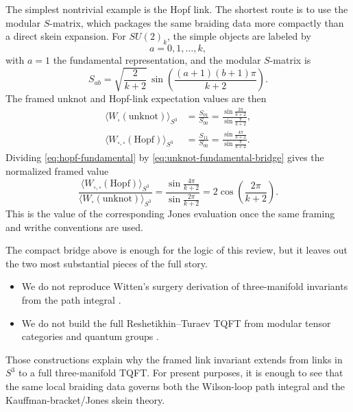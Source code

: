 \documentclass[11pt]{article}
\theoremstyle{definition}
\numberwithin{theorem}{section}
\numberwithin{equation}{section}
\begin{document}
The simplest nontrivial example is the Hopf link. The shortest route is to use the modular $S$-matrix, which packages the same braiding data more compactly than a direct skein expansion. For $SU(2)_k$, the simple objects are labeled by
\begin{equation}\label{eq:su2-labels}
a=0,1,\ldots,k,
\end{equation}
with $a=1$ the fundamental representation, and the modular $S$-matrix is
\begin{equation}\label{eq:su2-S-matrix}
S_{ab}
=
\sqrt{\frac{2}{k+2}}\,
\sin\!\left(\frac{(a+1)(b+1)\pi}{k+2}\right).
\end{equation}
The framed unknot and Hopf-link expectation values are then
\begin{align}
\bigl\langle W_{\square}(\text{unknot})\bigr\rangle_{S^3}
&=
\frac{S_{01}}{S_{00}}
=
\frac{\sin\frac{2\pi}{k+2}}{\sin\frac{\pi}{k+2}}, \label{eq:unknot-fundamental-bridge} \\[1mm]
\bigl\langle W_{\square,\square}(\text{Hopf})\bigr\rangle_{S^3}
&=
\frac{S_{11}}{S_{00}}
=
\frac{\sin\frac{4\pi}{k+2}}{\sin\frac{\pi}{k+2}}. \label{eq:hopf-fundamental}
\end{align}
Dividing \eqref{eq:hopf-fundamental} by \eqref{eq:unknot-fundamental-bridge} gives the normalized framed value
\begin{equation}\label{eq:hopf-normalized}
\frac{\bigl\langle W_{\square,\square}(\text{Hopf})\bigr\rangle_{S^3}}
{\bigl\langle W_{\square}(\text{unknot})\bigr\rangle_{S^3}}
=
\frac{\sin\frac{4\pi}{k+2}}{\sin\frac{2\pi}{k+2}}
=
2\cos\!\left(\frac{2\pi}{k+2}\right).
\end{equation}
This is the value of the corresponding Jones evaluation once the same framing and writhe conventions are used.

\begin{remark}\label{rem:witten-jones-skipped}
The compact bridge above is enough for the logic of this review, but it leaves out the two most substantial pieces of the full story.
\begin{itemize}
\item We do not reproduce Witten's surgery derivation of three-manifold invariants from the path integral \cite{Witten1989Jones}.
\item We do not build the full Reshetikhin--Turaev TQFT from modular tensor categories and quantum groups \cite{ReshetikhinTuraev1991,Turaev2016QuantumInvariants}.
\end{itemize}
Those constructions explain why the framed link invariant extends from links in $S^3$ to a full three-manifold TQFT. For present purposes, it is enough to see that the same local braiding data governs both the Wilson-loop path integral and the Kauffman-bracket/Jones skein theory.
\end{remark}
\end{document}
